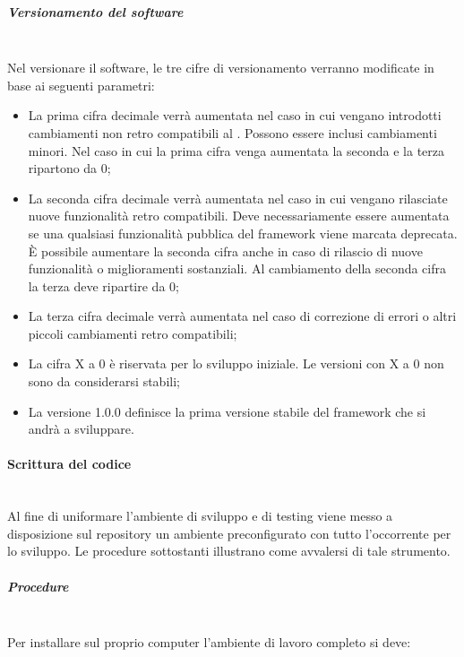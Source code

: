 \subparagraph{Versionamento del software} \hfill \\

Nel versionare il software, le tre cifre di versionamento verranno modificate in base ai seguenti parametri:
\begin{itemize}
\item La prima cifra decimale verrà aumentata nel caso in cui vengano introdotti cambiamenti non retro compatibili al . Possono essere inclusi cambiamenti minori. Nel caso in cui la prima cifra venga aumentata la seconda e la terza ripartono da 0;
\item La seconda cifra decimale verrà aumentata nel caso in cui vengano rilasciate nuove funzionalità retro compatibili. Deve necessariamente essere aumentata se una qualsiasi funzionalità pubblica del framework viene marcata deprecata. È possibile aumentare la seconda cifra anche in caso di rilascio di nuove funzionalità o miglioramenti sostanziali. Al cambiamento della seconda cifra la terza deve ripartire da 0;
\item La terza cifra decimale verrà aumentata nel caso di correzione di errori o altri piccoli cambiamenti retro compatibili;
\item La cifra X a 0 è riservata per lo sviluppo iniziale. Le versioni con X a 0 non sono da considerarsi stabili;
\item La versione 1.0.0 definisce la prima versione stabile del framework che si andrà a sviluppare.
\end{itemize}

\paragraph{Scrittura del codice} \hfill \\
Al fine di uniformare l'ambiente di sviluppo e di testing viene messo a disposizione sul repository un ambiente preconfigurato con tutto l'occorrente per lo sviluppo.
Le procedure sottostanti illustrano come avvalersi di tale strumento.

\subparagraph{Procedure} \hfill \\
Per installare sul proprio computer l'ambiente di lavoro completo si deve:

